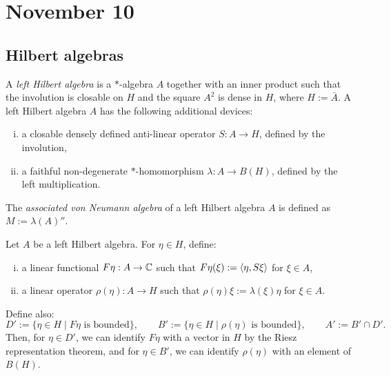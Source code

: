 \documentclass{../../small}
\begin{document}
\newpage
\section{November 10}
\subsection{Hilbert algebras}

\begin{defn}
A \emph{left Hilbert algebra} is a $*$-algebra $A$ together with an inner product such that the involution is closable on $H$ and the square $A^2$ is dense in $H$, where $H:=\bar A$.
A left Hilbert algebra $A$ has the following additional devices:
\begin{enumerate}[(i)]
\item a closable densely defined anti-linear operator $S:A\to H$, defined by the involution,
\item a faithful non-degenerate $*$-homomorphism $\lambda:A\to B(H)$, defined by the left multiplication.
\end{enumerate}
The \emph{associated von Neumann algebra} of a left Hilbert algebra $A$ is defined as $M:=\lambda(A)''$.
\end{defn}

\begin{defn}
Let $A$ be a left Hilbert algebra.
For $\eta\in H$, define:
\begin{enumerate}[(i)]
\item a linear functional $F\eta:A\to\mathbb{C}$ such that $F\eta(\xi):=\langle\eta,S\xi\rangle$ for $\xi\in A$,
\item a linear operator $\rho(\eta):A\to H$ such that $\rho(\eta)\xi:=\lambda(\xi)\eta$ for $\xi\in A$.
\end{enumerate}
Define also:
\[D':=\{\eta\in H\mid F\eta\text{ is bounded}\},\qquad
B':=\{\eta\in H\mid \rho(\eta)\text{ is bounded}\},\qquad
A':=B'\cap D'.\]
Then, for $\eta\in D'$, we can identify $F\eta$ with a vector in $H$ by the Riesz representation theorem, and for $\eta\in B'$, we can identify $\rho(\eta)$ with an element of $B(H)$.
\end{defn}
\end{document}
